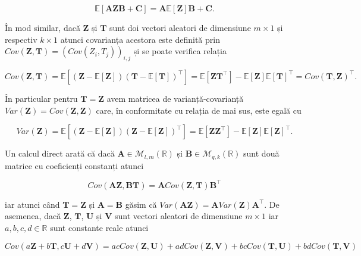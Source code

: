 \documentclass[]{article}
\begin{document}
\[
  \mathbb{E}\left[\boldsymbol A\boldsymbol Z\boldsymbol B + \boldsymbol C\right] = \boldsymbol A\mathbb{E}[\boldsymbol Z]\boldsymbol B + \boldsymbol C.
\]

În mod similar, dacă \(\boldsymbol Z\) și \(\boldsymbol T\) sunt doi
vectori aleatori de dimensiune \(m\times 1\) și respectiv \(k\times 1\)
atunci covarianța acestora este definită prin
\(Cov(\boldsymbol Z, \boldsymbol T) = \left(Cov(Z_i, T_j)\right)_{i,j}\)
și se poate verifica relația

\[
  Cov(\boldsymbol Z, \boldsymbol T) = \mathbb{E}\left[\left(\boldsymbol Z - \mathbb{E}[\boldsymbol Z]\right)\left(\boldsymbol T - \mathbb{E}[\boldsymbol T]\right)^\intercal\right] = \mathbb{E}\left[\boldsymbol Z\boldsymbol T^\intercal\right] - \mathbb{E}\left[\boldsymbol Z\right]\mathbb{E}\left[\boldsymbol T\right]^\intercal = Cov(\boldsymbol T, \boldsymbol Z)^\intercal.
\]

În particular pentru \(\boldsymbol T = \boldsymbol Z\) avem matricea de
varianță-covarianță
\(Var(\boldsymbol Z) = Cov(\boldsymbol Z, \boldsymbol Z)\) care, în
conformitate cu relația de mai sus, este egală cu

\[
  Var(\boldsymbol Z) = \mathbb{E}\left[\left(\boldsymbol Z - \mathbb{E}[\boldsymbol Z]\right)\left(\boldsymbol Z - \mathbb{E}[\boldsymbol Z]\right)^\intercal\right] = \mathbb{E}\left[\boldsymbol Z\boldsymbol Z^\intercal\right] - \mathbb{E}\left[\boldsymbol Z\right]\mathbb{E}\left[\boldsymbol Z\right]^\intercal.
\]

Un calcul direct arată că dacă
\(\boldsymbol A\in\mathcal{M}_{l,m}(\mathbb{R})\) și
\(\boldsymbol B\in\mathcal{M}_{q, k}(\mathbb{R})\) sunt două matrice cu
coeficienți constanți atunci

\[
  Cov\left(\boldsymbol A\boldsymbol Z, \boldsymbol B\boldsymbol T\right) = \boldsymbol A Cov\left(\boldsymbol Z, \boldsymbol T\right)\boldsymbol B^\intercal
\]

iar atunci când \(\boldsymbol T = \boldsymbol Z\) și
\(\boldsymbol A = \boldsymbol B\) găsim că
\(Var(\boldsymbol A\boldsymbol Z) = \boldsymbol A Var(\boldsymbol Z)\boldsymbol A^\intercal\).
De asemenea, dacă \(\boldsymbol Z\), \(\boldsymbol T\),
\(\boldsymbol U\) și \(\boldsymbol V\) sunt vectori aleatori de
dimensiune \(m\times 1\) iar \(a,b,c,d\in\mathbb{R}\) sunt constante
reale atunci

\[
  Cov(a\boldsymbol Z + b\boldsymbol T, c\boldsymbol U + d\boldsymbol V) = ac Cov(\boldsymbol Z, \boldsymbol U) + ad Cov(\boldsymbol Z, \boldsymbol V) + bc Cov(\boldsymbol T, \boldsymbol U) + bd Cov(\boldsymbol T, \boldsymbol V)
\]
\end{document}
